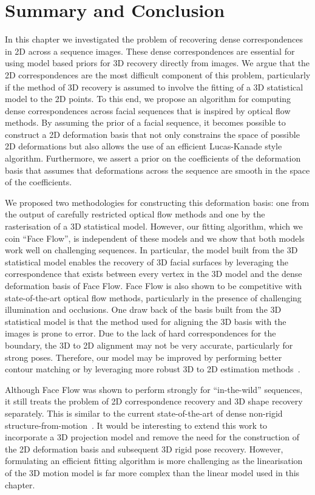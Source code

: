 \section{Summary and Conclusion}\label{sec:face_flow_conclusion}
In this chapter we investigated the problem of recovering dense correspondences
in 2D across a sequence images. These dense correspondences are essential
for using model based priors for 3D recovery directly from images. We argue that
the 2D correspondences are the most difficult component of this problem,
particularly if the method of 3D recovery is assumed to involve the fitting
of a 3D statistical model to the 2D points. To this end, we propose an algorithm
for computing dense correspondences across facial sequences that is inspired by
optical flow methods. By assuming the prior of a facial sequence, it becomes
possible to construct a 2D deformation basis that not only constrains the space
of possible 2D deformations but also allows the use of an efficient Lucas-Kanade
style algorithm. Furthermore, we assert a prior on the coefficients
of the deformation basis that assumes that deformations across the sequence
are smooth in the space of the coefficients.

We proposed two methodologies for constructing this deformation basis: one
from the output of carefully restricted optical flow methods and one by
the rasterisation of a 3D statistical model. However, our fitting algorithm,
which we coin ``Face Flow'', is independent of these models and we show that
both models work well on challenging sequences. In particular, the model built
from the 3D statistical model enables the recovery of 3D facial surfaces by
leveraging the correspondence that exists between every vertex in the 3D model
and the dense deformation basis of Face Flow. Face Flow is also shown to be
competitive with state-of-the-art optical flow methods, particularly in
the presence of challenging illumination and occlusions. One draw back
of the basis built from the 3D statistical model is that the method used
for aligning the 3D basis with the images is prone to error. Due to the lack
of hard correspondences for the boundary, the 3D to 2D alignment may not be
very accurate, particularly for strong poses. Therefore, our model
may be improved by performing better contour matching or by leveraging
more robust 3D to 2D estimation methods~\cite{zhou20153d}.

Although Face Flow was shown to perform strongly for ``in-the-wild'' sequences,
it still treats the problem of 2D correspondence recovery and 3D shape recovery
separately.  This is similar to the current state-of-the-art of dense non-rigid
structure-from-motion~\cite{garg2013dense}. It would be interesting to
extend this work to incorporate a 3D projection model and remove the need
for the construction of the 2D deformation basis and subsequent 3D rigid pose
recovery. However, formulating an efficient fitting algorithm is more challenging
as the linearisation of the 3D motion model is far more complex than the linear
model used in this chapter.
